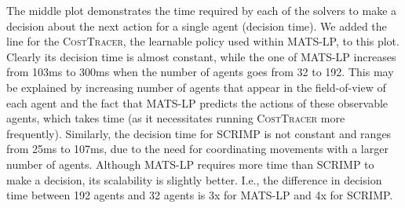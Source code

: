 \documentclass[letterpaper]{article} %
\begin{document}
The middle plot demonstrates the time required by each of the solvers to make a decision about the next action for a single agent (decision time). We added the line for the \textsc{CostTracer}, the learnable policy used within MATS-LP, to this plot. Clearly its decision time is almost constant, while the one of MATS-LP increases from 103ms to 300ms when the number of agents goes from 32 to 192. This may be explained by increasing number of agents that appear in the field-of-view of each agent and the fact that MATS-LP predicts the actions of these observable agents, which takes time (as it necessitates running \textsc{CostTracer} more frequently). Similarly, the decision time for SCRIMP is not constant and ranges from 25ms to 107ms, due to the need for coordinating movements with a larger number of agents. Although MATS-LP requires more time than SCRIMP to make a decision, its scalability is slightly better. I.e., the difference in decision time between 192 agents and 32 agents is 3x for MATS-LP and 4x for SCRIMP.
\end{document}

